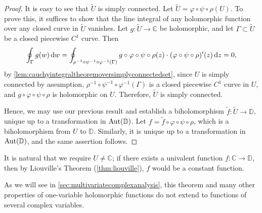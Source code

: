 \begin{proof}
    It is easy to see that \(\widetilde{U}\) is simply connected. Let \(\widetilde{U}=\varphi\circ\psi\circ\rho(U)\). To prove this, it suffices to show that the line integral of any holomorphic function over any closed curve in \(\widetilde{U}\) vanishes. Let \(g:\widetilde{U}\to\mathbb{C}\) be holomorphic, and let \(\Gamma\subset\widetilde{U}\) be a closed piecewise \(C^1\) curve. Then \[\oint_\Gamma g(w)\dd{w}=\oint_{\rho^{-1}\circ\psi^{-1}\circ\varphi^{-1}(\Gamma)}g\circ\varphi\circ\psi\circ\rho(z)\cdot(\varphi\circ\psi\circ\rho)'(z)\dd{z}=0,\]
    by \cref{lem:cauchyintegraltheoremoversimplyconnectedset}, since \(U\) is simply connected by assumption, \(\rho^{-1}\circ\psi^{-1}\circ\varphi^{-1}(\Gamma)\) is a closed piecewise \(C^1\) curve in \(U\), and \(g\circ\varphi\circ\psi\circ\rho\) is holomorphic on \(U\). Therefore, \(\widetilde{U}\) is simply connected.

    Hence, we may use our previous result and establish a biholomorphism \(\widetilde{f}:\widetilde{U}\to\mathbb{D}\), unique up to a transformation in \(\operatorname{Aut}(\mathbb{D})\). Let \(f=\widetilde{f}\circ\varphi\circ\psi\circ\rho\), which is a biholomorphism from \(U\) to \(\mathbb{D}\). Similarly, it is unique up to a transformation in \(\operatorname{Aut}(\mathbb{D})\), and the same assertion follows.
\end{proof}
\begin{remark}
    It is natural that we require \(U\neq\mathbb{C}\); if there exists a univalent function \(f:\mathbb{C}\to\mathbb{D}\), then by Liouville's Theorem (\cref{thm:liouville}), \(f\) would be a constant function.

    As we will see in \cref{sec:multivariatecomplexanalysis}, this theorem and many other properties of one-variable holomorphic functions do not extend to functions of several complex variables.
\end{remark}
